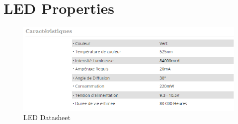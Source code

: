 \documentclass[12pt,a4paper,fleqn, onesside]{report}
\begin{document}


\appendix
{}
\section{LED Properties}
\label{LEDdatasheet}
\begin{figure}[h]
  \centerline{\includegraphics[scale=0.8]{fig/LedDataSheet.png}}
  \caption{LED Datasheet}
  \label{fig:LEDdatasheet}
\end{figure}
\end{document}
